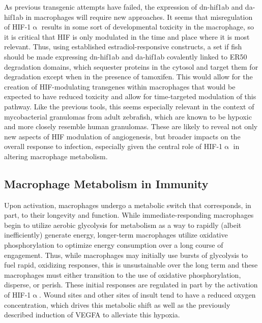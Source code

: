 As previous transgenic attempts have failed, the expression of dn-hif1ab and da-hif1ab in macrophages will require new approaches. It seems that misregulation of HIF-1$\upalpha$ results in some sort of developmental toxicity in the macrophage, so it is critical that HIF is only modulated in the time and place where it is most relevant. Thus, using established estradiol-responsive constructs, a set if fish should be made expressing dn-hif1ab and da-hif1ab covalently linked to ER50 degradation domains, which sequester proteins in the cytosol and target them for degradation except when in the presence of tamoxifen. This would allow for the creation of HIF-modulating transgenes within macrophages that would be expected to have reduced toxicity and allow for time-targeted modulation of this pathway. Like the previous tools, this seems especially relevant in the context of mycobacterial granulomas from adult zebrafish, which are known to be hypoxic and more closely resemble human granulomas. These are likely to reveal not only new aspects of HIF modulation of angiogenesis, but broader impacts on the overall response to infection, especially given the central role of HIF-1$\upalpha$ in altering macrophage metabolism.

\subsection{Macrophage Metabolism in Immunity}

Upon activation, macrophages undergo a metabolic switch that corresponds, in part, to their longevity and function. While immediate-responding macrophages begin to utilize aerobic glycolysis for metabolism as a way to rapidly (albeit inefficiently) generate energy, longer-term macrophages utilize oxidative phosphorylation to optimize energy consumption over a long course of engagement. Thus, while macrophages may initially use bursts of glycolysis to fuel rapid, oxidizing responses, this is unsustainable over the long term and these macrophages must either transition to the use of oxidative phosphorylation, disperse, or perish. These initial responses are regulated in part by the activation of HIF-1$\upalpha$. Wound sites and other sites of insult tend to have a reduced oxygen concentration, which drives this metabolic shift as well as the previously described induction of VEGFA to alleviate this hypoxia. 

